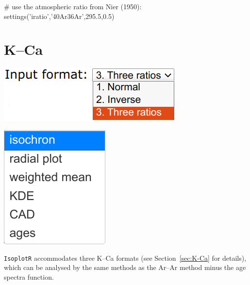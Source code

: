 \begin{refsection}
\begin{script}
# use the atmospheric ratio from Nier (1950):
settings('iratio','40Ar36Ar',295.5,0.5)
\end{script}

\section{K--Ca}\label{sec:KCa-R}

\noindent\begin{minipage}[t]{.3\linewidth}
\strut\vspace*{-\baselineskip}\newline
\includegraphics[width=\linewidth]{../figures/PbPbFormats.png}
\end{minipage}
\noindent\begin{minipage}[t]{.15\linewidth}
\strut\vspace*{-\baselineskip}\newline
\includegraphics[width=\linewidth]{../figures/PbPbPlotdevices.png}
\end{minipage}
\begin{minipage}[t]{.55\textwidth}
  \texttt{IsoplotR} accommodates three K--Ca formats (see
  Section~\ref{sec:K-Ca} for details), which can be analysed by the
  same methods as the Ar--Ar method minus the age spectra function.
\end{minipage}


\end{refsection}
